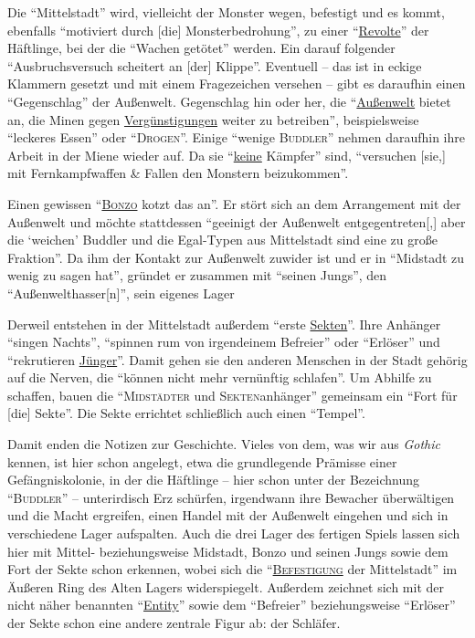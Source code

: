 \documentclass[a5paper,pagesize,numbers=noenddot]{scrbook}
\begin{document}
Die \enquote{Mittelstadt} wird, vielleicht der Monster wegen, befestigt und es kommt, ebenfalls \enquote{motiviert durch [die] Monsterbedrohung}, zu einer \enquote{\uline{Revolte}} der Häftlinge, bei der die \enquote{Wachen getötet} werden.
Ein darauf folgender \enquote{Ausbruchsversuch scheitert an [der] Klippe}.
Eventuell -- das ist in eckige Klammern gesetzt und mit einem Fragezeichen versehen -- gibt es daraufhin einen \enquote{Gegenschlag} der Außenwelt.
Gegenschlag hin oder her, die \enquote{\uline{Außenwelt} bietet an, die Minen gegen \uline{Vergünstigungen} weiter zu betreiben}, beispielsweise \enquote{leckeres Essen} oder \enquote{\textsc{Drogen}}.
Einige \enquote{wenige \textsc{Buddler}} nehmen daraufhin ihre Arbeit in der Miene wieder auf. Da sie \enquote{\uline{keine} Kämpfer} sind, \enquote{versuchen [sie,] mit Fernkampfwaffen \& Fallen den Monstern beizukommen}.

Einen gewissen \enquote{\textsc{\uline{Bonzo}} kotzt das an}.
Er stört sich an dem Arrangement mit der Außenwelt und möchte stattdessen \enquote{geeinigt der Außenwelt entgegentreten[,] aber die \enquote{weichen} Buddler und die Egal-Typen aus Mittelstadt sind eine zu große Fraktion}.
Da ihm der Kontakt zur Außenwelt zuwider ist und er in \enquote{Midstadt zu wenig zu sagen hat}, gründet er zusammen mit \enquote{seinen Jungs}, den \enquote{Außenwelthasser[n]}, sein eigenes Lager

Derweil entstehen in der Mittelstadt außerdem \enquote{erste \uline{Sekten}}.
Ihre Anhänger \enquote{singen Nachts}, \enquote{spinnen rum von irgendeinem Befreier} oder \enquote{Erlöser} und \enquote{rekrutieren \uline{Jünger}}.
Damit gehen sie den anderen Menschen in der Stadt gehörig auf die Nerven, die \enquote{können nicht mehr vernünftig schlafen}.
Um Abhilfe zu schaffen, bauen die \enquote{\textsc{Midstädter} und \textsc{Sekten}anhänger} gemeinsam ein \enquote{Fort für [die] Sekte}.
Die Sekte errichtet schließlich auch einen \enquote{Tempel}.

Damit enden die Notizen zur Geschichte.
Vieles von dem, was wir aus \textit{Gothic} kennen, ist hier schon angelegt, etwa die grundlegende Prämisse einer Gefängniskolonie, in der die Häftlinge -- hier schon unter der Bezeichnung \enquote{\textsc{Buddler}} -- unterirdisch Erz schürfen, irgendwann ihre Bewacher überwältigen und die Macht ergreifen, einen Handel mit der Außenwelt eingehen und sich in verschiedene Lager aufspalten.
Auch die drei Lager des fertigen Spiels lassen sich hier mit Mittel- beziehungsweise Midstadt, Bonzo und seinen Jungs sowie dem Fort der Sekte schon erkennen, wobei sich die \enquote{\textsc{\uline{Befestigung}} der Mittelstadt} im Äußeren Ring des Alten Lagers widerspiegelt.
Außerdem zeichnet sich mit der nicht näher benannten \enquote{\uline{Entity}} sowie dem \enquote{Befreier} beziehungsweise \enquote{Erlöser} der Sekte schon eine andere zentrale Figur ab: der Schläfer.
\end{document}
